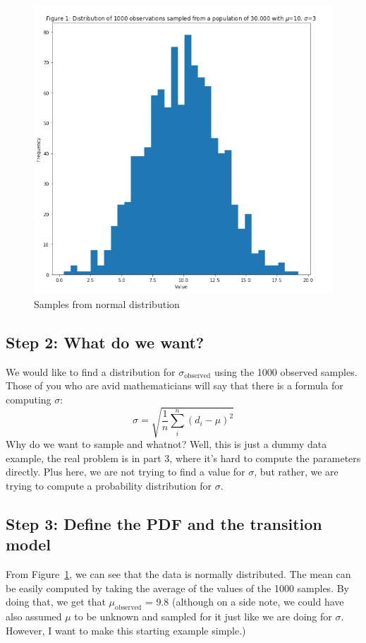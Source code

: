 \begin{figure}[h]
    \centering
\includegraphics[width=.6\textwidth]{pic/p05c08-snip02}
    \caption{Samples from normal distribution}
    \label{fig:p05c08-snip02}
\end{figure}


\subsection{Step 2: What do we want?}
We would like to find a distribution for $\sigma_\textrm{observed}$ using the 1000 observed samples. Those of you who are avid mathematicians will say that there is a formula for computing $\sigma$:
\begin{equation}
\sigma=\sqrt{\frac{1}{n} \sum_{i}^{n}\left(d_{i}-\mu\right)^{2}}
\end{equation}
Why do we want to sample and whatnot? Well, this is just a dummy data example, the real problem is in part 3, where it's hard to compute the parameters directly. Plus here, we are not trying to find a value for $\sigma$, but rather, we are trying to compute a probability distribution for $\sigma$.

\subsection{Step 3: Define the PDF and the transition model}
From Figure~\ref{fig:p05c08-snip02}, we can see that the data is normally distributed. The mean can be easily computed by taking the average of the values of the 1000 samples. By doing that, we get that  $\mu_\textrm{observed}$ = 9.8 (although on a side note, we could have also assumed  $\mu$ to be unknown and sampled for it just like we are doing for $\sigma$. However, I want to make this starting example simple.)

